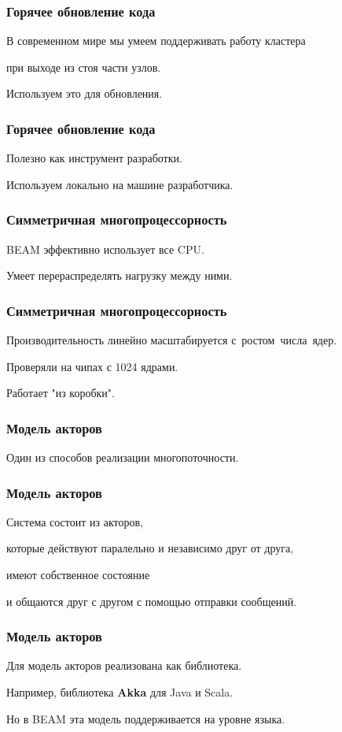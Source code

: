 \documentclass[10pt]{beamer}
\begin{document}
\begin{frame}
  \frametitle{Горячее обновление кода}
  В современном мире мы умеем поддерживать работу кластера
  \par \bigskip
  при выходе из стоя части узлов.
  \par \bigskip
  Используем это для обновления.
\end{frame}

\begin{frame}
  \frametitle{Горячее обновление кода}
  Полезно как инструмент разработки.
  \par \bigskip
  Используем локально на машине разработчика.
\end{frame}

\begin{frame}
  \frametitle{Симметричная многопроцессорность}
  BEAM эффективно использует все CPU.
  \par \bigskip
  Умеет перераспределять нагрузку между ними.
\end{frame}

\begin{frame}
  \frametitle{Симметричная многопроцессорность}
  Производительность линейно масштабируется с~ростом~числа~ядер.
  \par \bigskip
  Проверяли на чипах с 1024 ядрами.
  \par \bigskip
  Работает "из коробки".
\end{frame}

\begin{frame}
  \frametitle{Модель акторов}
  Один из способов реализации многопоточности.
\end{frame}

\begin{frame}
  \frametitle{Модель акторов}
  Система состоит из акторов,
  \par \bigskip
  которые действуют паралельно и независимо друг от друга,
  \par \bigskip
  имеют собственное состояние
  \par \bigskip
  и общаются друг с другом с помощью отправки сообщений.
\end{frame}

\begin{frame}
  \frametitle{Модель акторов}
  Для модель акторов реализована как библиотека.
  \par \bigskip
  Например, библиотека \textbf{Akka} для Java и Scala.
  \par \bigskip
  Но в BEAM эта модель поддерживается на уровне языка.
\end{frame}
\end{document}

